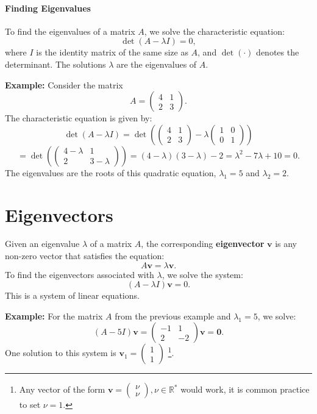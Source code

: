 \documentclass[]{article}
\newcommand{\R}{\mathbb{R}}
\begin{document}
	\paragraph{Finding Eigenvalues}
	To find the eigenvalues of a matrix $ A $, we solve the characteristic equation:
	$$
	\det(A - \lambda I) = 0,
	$$
	where $ I $ is the identity matrix of the same size as $ A $, and $ \det(\cdot) $ denotes the determinant. The solutions $ \lambda $ are the eigenvalues of $ A $.
	
	\noindent \textbf{Example:}
	Consider the matrix
	$$
	A = \begin{pmatrix}
		4 & 1 \\
		2 & 3
	\end{pmatrix}.
	$$
	The characteristic equation is given by:
	$$
	\det(A - \lambda I) = \det\left(\begin{pmatrix}
		4 & 1 \\
		2 & 3
	\end{pmatrix} - \lambda \begin{pmatrix}
		1 & 0 \\
		0 & 1
	\end{pmatrix}\right)
	$$
	$$ = \det\left(\begin{pmatrix}
		4-\lambda & 1 \\
		2 & 3-\lambda
	\end{pmatrix}\right) = (4-\lambda)(3-\lambda) - 2 = \lambda^2 - 7\lambda + 10 = 0.
	$$
	The eigenvalues are the roots of this quadratic equation, $ \lambda_1 = 5 $ and $ \lambda_2 = 2 $.
	
	\section{Eigenvectors}
	
	Given an eigenvalue $\lambda$ of a matrix $A$, the corresponding \textbf{eigenvector} $\mathbf{v}$ is any non-zero vector that satisfies the equation:
	$$
	A \mathbf{v} = \lambda \mathbf{v}.
	$$
	To find the eigenvectors associated with $\lambda$, we solve the system:
	$$
	(A - \lambda I)\mathbf{v} = 0.
	$$
	This is a system of linear equations.
	
	\noindent \textbf{Example:}
	For the matrix $ A $ from the previous example and $ \lambda_1 = 5 $, we solve:
	$$
	(A - 5I)\mathbf{v} = \begin{pmatrix}
		-1 & 1 \\
		2 & -2
	\end{pmatrix} \mathbf{v} = \mathbf{0}.
	$$
	One solution to this system is $\mathbf{v}_1 = \begin{pmatrix} 1 \\ 1 \end{pmatrix}$
	\footnote{Any vector of the form $\mathbf{v} = \begin{pmatrix} \nu \\ \nu \end{pmatrix}, \nu \in \R^*$ would work, it is common practice to set $\nu=1$.}.
	
\end{document}
